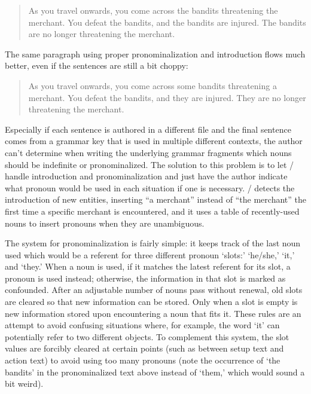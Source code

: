 \begin{quote}
  As you travel onwards, you come across the bandits threatening the merchant. You defeat the bandits, and the bandits are injured. The bandits are no longer threatening the merchant.
\end{quote}

The same paragraph using proper pronominalization and introduction flows much better, even if the sentences are still a bit choppy:

\begin{quote}
  As you travel onwards, you come across some bandits threatening a merchant. You defeat the bandits, and they are injured. They are no longer threatening the merchant.
\end{quote}

Especially if each sentence is authored in a different file and the final sentence comes from a grammar key that is used in multiple different contexts, the author can't determine when writing the underlying grammar fragments which nouns should be indefinite or pronominalized.
%
The solution to this problem is to let \dunyazad/ handle introduction and pronominalization and just have the author indicate what pronoun would be used in each situation if one is necessary.
%
\dunyazad/ detects the introduction of new entities, inserting ``a merchant'' instead of ``the merchant'' the first time a specific merchant is encountered, and it uses a table of recently-used nouns to insert pronouns when they are unambiguous.


The system for pronominalization is fairly simple: it keeps track of the last noun used which would be a referent for three different pronoun `slots:' `he/she,' `it,' and `they.'
%
When a noun is used, if it matches the latest referent for its slot, a pronoun is used instead; otherwise, the information in that slot is marked as confounded.
%
After an adjustable number of nouns pass without renewal, old slots are cleared so that new information can be stored.
%
Only when a slot is empty is new information stored upon encountering a noun that fits it.
%
These rules are an attempt to avoid confusing situations where, for example, the word `it' can potentially refer to two different objects.
%
To complement this system, the slot values are forcibly cleared at certain points (such as between setup text and action text) to avoid using too many pronouns (note the occurrence of `the bandits' in the pronominalized text above instead of `them,' which would sound a bit weird).



